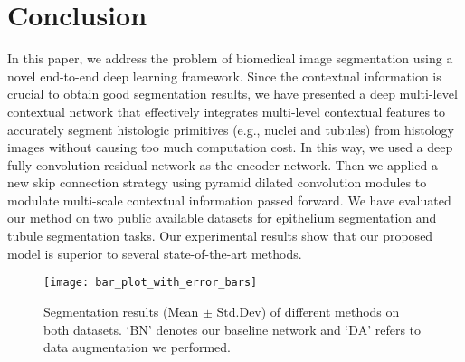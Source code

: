 \documentclass[10pt,twocolumn]{article}
\begin{document}
\section{Conclusion}\label{s5}
In this paper, we address the problem of biomedical image segmentation using a novel end-to-end deep learning framework. Since the contextual information is crucial to obtain good segmentation results, we have presented a deep multi-level contextual network that effectively integrates multi-level contextual features to accurately segment histologic primitives (e.g., nuclei and tubules) from histology images without causing too much computation cost. In this way, we used a deep fully convolution residual network as the encoder network. Then we applied a new skip connection strategy using pyramid dilated convolution modules to modulate multi-scale contextual information passed forward. 
We have evaluated our method on two public available datasets for epithelium segmentation and tubule segmentation tasks.
Our experimental results show that our proposed model is superior to several state-of-the-art methods.

\begin{figure}[h]
\centering
\texttt{[image: bar\_plot\_with\_error\_bars]}
\caption{Segmentation results (Mean $\pm$ Std.Dev) of different methods on both datasets. \lq BN\rq \space
 denotes our baseline network and \lq DA\rq \space
refers to data augmentation we performed.} 
\label{f8}
\end{figure}
\end{document}
